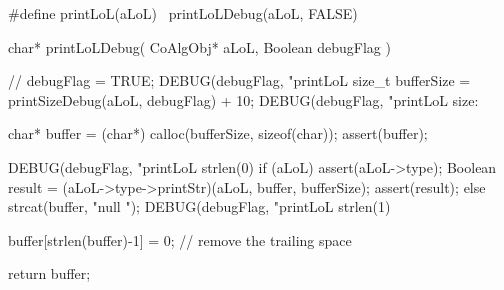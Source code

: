 #define printLoL(aLoL)      \
  printLoLDebug(aLoL, FALSE)
\stopCHeader

\startCCode
char* printLoLDebug(
  CoAlgObj* aLoL, 
  Boolean debugFlag
) {
  //  debugFlag = TRUE;
  DEBUG(debugFlag, "printLoL %
  size_t bufferSize = printSizeDebug(aLoL, debugFlag) + 10;
  DEBUG(debugFlag, "printLoL size:%

  char* buffer = (char*) calloc(bufferSize, sizeof(char));
  assert(buffer);

  DEBUG(debugFlag, "printLoL strlen(0) %
  if (aLoL) {
    assert(aLoL->type);
    Boolean result = (aLoL->type->printStr)(aLoL, buffer, bufferSize);
    assert(result);
  } else strcat(buffer, "null ");
  DEBUG(debugFlag, "printLoL strlen(1) %

  buffer[strlen(buffer)-1] = 0; // remove the trailing space

  return buffer;
}
\stopCCode